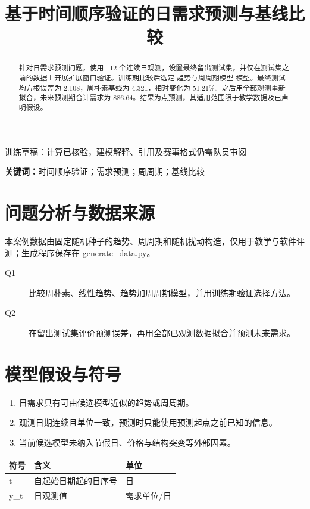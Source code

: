 \documentclass[UTF8,a4paper,11pt,fontset=fandol]{ctexart}
\title{\bfseries 基于时间顺序验证的日需求预测与基线比较}
\author{}
\date{}
\begin{document}
\maketitle
\vspace{-2.4em}
\begin{center}\small\color{accent}训练草稿：计算已核验，建模解释、引用及赛事格式仍需队员审阅\end{center}
\begin{abstract}
针对日需求预测问题，使用 112 个连续日观测，设置最终留出测试集，并仅在测试集之前的数据上开展扩展窗口验证。训练期比较后选定 趋势与周周期模型 模型。最终测试均方根误差为 2.108，周朴素基线为 4.321，相对变化为 51.21\%。之后用全部观测重新拟合，未来预测期合计需求为 886.64。结果为点预测，其适用范围限于教学数据及已声明假设。
\end{abstract}
\noindent\textbf{关键词：}时间顺序验证；需求预测；周周期；基线比较

\section{问题分析与数据来源}
本案例数据由固定随机种子的趋势、周周期和随机扰动构造，仅用于教学与软件评测；生成程序保存在 generate\_data.py。
\begin{description}

\item[Q1] 比较周朴素、线性趋势、趋势加周周期模型，并用训练期验证选择方法。

\item[Q2] 在留出测试集评价预测误差，再用全部已观测数据拟合并预测未来需求。

\end{description}

\section{模型假设与符号}
\begin{enumerate}

\item 日需求具有可由候选模型近似的趋势或周周期。

\item 观测日期连续且单位一致，预测时只能使用预测起点之前已知的信息。

\item 当前候选模型未纳入节假日、价格与结构突变等外部因素。

\end{enumerate}
\begin{longtable}{p{}p{}p{}}
\toprule 符号 & 含义 & 单位 \\ \midrule

t & 自起始日期起的日序号 & 日 \\

y\_t & 日观测值 & 需求单位/日 \\

\bottomrule
\end{longtable}
\end{document}

